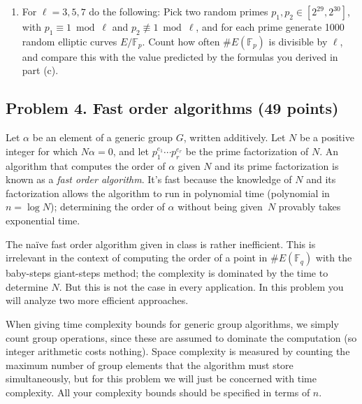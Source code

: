 \documentclass[11pt]{article}
\newcommand{\Fp}{\mathbb{F}_p}
\newcommand{\Fq}{\mathbb{F}_q}
\newcommand{\FF}{\mathbb{F}}
\newcommand{\GL}{{\rm GL}}
\begin{document}
\begin{enumerate}[{\bf (a)}]
As a warm-up, for $\ell=3$ use Sage to count the number of matrices $\pi_\ell \in \GL_2(\FF_3)$ with trace $d+1$ for $d=1$ and $d=2$.
You can then compute the probability of $\ell$-torsion for a fixed $p\equiv 1\bmod 3$ or $p\equiv 2\bmod 3$, and also the average probability for varying~$p$ by averaging over the 2 possible values of $d=\det\pi_\ell \equiv p\bmod \ell$.  

You can solve this problem with purely elementary methods, but if you know a little representation theory you may find it helpful to consult the character table for $\GL_2(\FF_\ell)$ (be sure to list your sources).
Assume initially that $\ell$ is odd, and after obtaining your formula, verify that it also works when $\ell=2$.

\item
For $\ell=3,5,7$ do the following:
Pick two random primes $p_1,p_2\in [2^{29},2^{30}]$, with $p_1\equiv 1\bmod\ell$ and $p_2\not\equiv 1\bmod\ell$, and for each prime generate 1000 random elliptic curves $E/\Fp$.
Count how often $\#E(\Fp)$ is divisible by $\ell$, and compare this with the value predicted by the formulas you derived in part (c).
\end{enumerate}

\subsection*{Problem 4. Fast order algorithms (49 points)}
Let $\alpha$ be an element of a generic group $G$, written additively.
Let $N$ be a positive integer for which $N\alpha=0$, and let $p_1^{e_1}\cdots p_r^{e_r}$ be the prime factorization of $N$.
An algorithm that computes the order of $\alpha$ given $N$ and its prime factorization is known as a \emph{fast order algorithm}.
It's fast because the knowledge of $N$ and its factorization allows the algorithm to run in polynomial time (polynomial in $n=\log N$); determining the order of $\alpha$ without being given~$N$ provably takes exponential time.

The na\"ive fast order algorithm given in class is rather inefficient.  This is irrelevant in the context of computing the order of a point in $\#E(\Fq)$ with the baby-steps giant-steps method; the complexity is dominated by the time to determine $N$.  But this is not the case in every application.  In this problem you will analyze two more efficient approaches.

When giving time complexity bounds for generic group algorithms, we simply count group operations, since these are assumed to dominate the computation (so integer arithmetic costs nothing).
Space complexity is measured by counting the maximum number of group elements that the algorithm must store simultaneously, but for this problem we will just be concerned with time complexity.
All your complexity bounds should be specified in terms of $n$.
\end{document}
